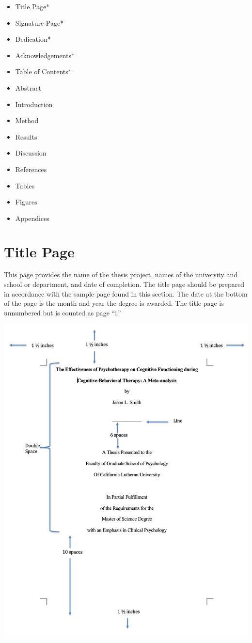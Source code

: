 \documentclass[openany]{book}
\providecommand{\tightlist}{%
  \setlength{\itemsep}{0pt}\setlength{\parskip}{0pt}}
\begin{document}
\begin{itemize}
\tightlist
\item
  Title Page*
\item
  Signature Page*
\item
  Dedication*
\item
  Acknowledgements*
\item
  Table of Contents*
\item
  Abstract
\item
  Introduction
\item
  Method
\item
  Results
\item
  Discussion
\item
  References
\item
  Tables
\item
  Figures
\item
  Appendices
\end{itemize}

\hypertarget{title-page}{%
\section{Title Page}\label{title-page}}

This page provides the name of the thesis project, names of the university and school or department, and date of completion. The title page should be prepared in accordance with the sample page found in this section. The date at the bottom of the page is the month and year the degree is awarded. The title page is unnumbered but is counted as page ``i.''

\includegraphics{images/titlepage.png}
\end{document}
